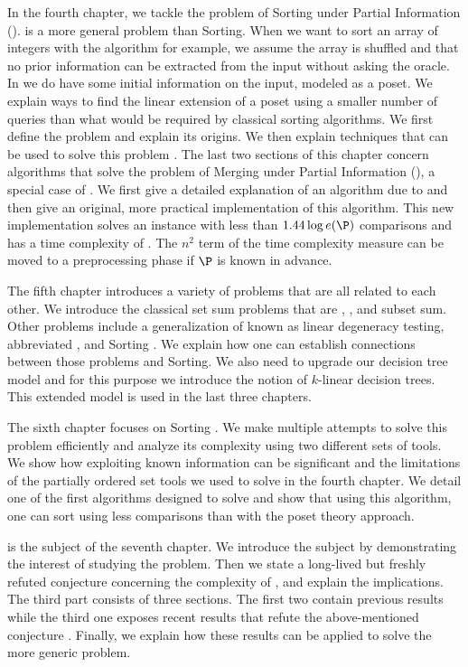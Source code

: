 In the fourth chapter, we tackle the problem of Sorting under Partial
Information (\SUPI). \SUPI is
a more general problem than Sorting. When we want to sort an array of integers
with the \quicksort algorithm for example, we assume the array is shuffled and
that no prior information can be extracted from the input without asking the
oracle. In \SUPI we do have some initial information on the input, modeled as a
poset. We explain ways
to find the linear extension of a poset using a smaller number of queries than
what would be required by classical sorting algorithms. We first define
the problem and explain its origins. We then explain techniques that can
be used to solve this problem \cite{kahn:1995,cardinal:2013}. The
last two sections of this chapter concern
algorithms that solve the problem of Merging under Partial Information
(\MUPI), a special case of \SUPI. We first
give a detailed explanation of an algorithm due to \citet*{linial:1984} and
then give an original, more practical implementation of this algorithm. This
new implementation solves an \MUPI instance with less than \(1.44 \log e(\P)\)
comparisons and has a time complexity of . The
\(n^2\) term of the time complexity measure can be moved to a preprocessing
phase if \(\P\) is known in advance.

The fifth chapter introduces a variety of problems that are all related to
each other. We introduce the classical set sum problems that are
\threeSUM, \kSUM, and subset sum. Other problems include a generalization of
\kSUM known as linear degeneracy testing, abbreviated \kLDT, and Sorting \XY.
We explain how one can establish connections between those problems and
Sorting. We also need to upgrade our decision tree model and for this
purpose we introduce the notion of \(k\)-linear decision trees. This
extended model is used in the last three chapters.

The sixth chapter focuses on Sorting \XY. We make
multiple attempts to solve this problem efficiently and analyze its complexity
using two different sets of tools. We show how exploiting known information
can be significant and the limitations of the partially ordered set tools
we used to solve \SUPI in the fourth chapter. We
detail one of the first algorithms designed to solve \SUPI
\cite{fredman:1976} and
show that using this algorithm, one can sort \XY
using less comparisons than with the poset theory approach.

\threeSUM is the subject of the seventh chapter. We introduce the
subject by demonstrating the interest of studying the \threeSUM problem. Then
we state a long-lived but freshly refuted conjecture concerning the
complexity of \threeSUM, and explain the implications. The third part
consists of three sections. The first two contain previous results
\cite{erickson:1999,ailon:2005} while
the third one exposes recent results that refute the above-mentioned
conjecture \cite{gronlund:2014}. Finally, we explain how these results can be applied to solve
the more generic \kLDT problem.

